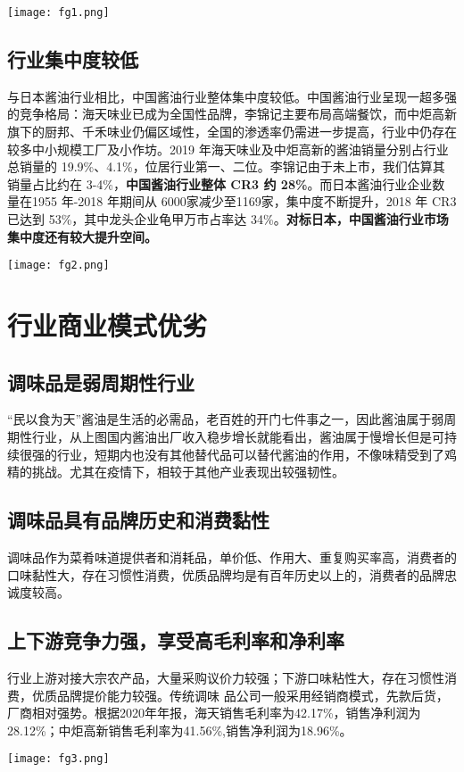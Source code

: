 \documentclass[UTF8,a4paper,zihao=-4,fontset = windows]{ctexart} %
\begin{document}
\texttt{[image: fg1.png]} 

\subsection{行业集中度较低}
与日本酱油行业相比，中国酱油行业整体集中度较低。中国酱油行业呈现一超多强的竞争格局：海天味业已成为全国性品牌，李锦记主要布局高端餐饮，而中炬高新旗下的厨邦、千禾味业仍偏区域性，全国的渗透率仍需进一步提高，行业中仍存在较多中小规模工厂及小作坊。2019 年海天味业及中炬高新的酱油销量分别占行业总销量的 19.9\%、4.1\%，位居行业第一、二位。李锦记由于未上市，我们估算其销量占比约在 3-4\%，\textbf{中国酱油行业整体 CR3 约 28\%}。而日本酱油行业企业数量在1955 年-2018 年期间从 6000家减少至1169家，集中度不断提升，2018 年 CR3 已达到 53\%，其中龙头企业龟甲万市占率达 34\%。\textbf{对标日本，中国酱油行业市场集中度还有较大提升空间。}

\texttt{[image: fg2.png]} 

\section{行业商业模式优劣}
\subsection{调味品是弱周期性行业}
“民以食为天”酱油是生活的必需品，老百姓的开门七件事之一，因此酱油属于弱周期性行业，从上图国内酱油出厂收入稳步增长就能看出，酱油属于慢增长但是可持续很强的行业，短期内也没有其他替代品可以替代酱油的作用，不像味精受到了鸡精的挑战。尤其在疫情下，相较于其他产业表现出较强韧性。
\subsection{调味品具有品牌历史和消费黏性}
调味品作为菜肴味道提供者和消耗品，单价低、作用大、重复购买率高，消费者的口味黏性大，存在习惯性消费，优质品牌均是有百年历史以上的，消费者的品牌忠诚度较高。
\subsection{上下游竞争力强，享受高毛利率和净利率}
行业上游对接大宗农产品，大量采购议价力较强；下游口味粘性大，存在习惯性消费，优质品牌提价能力较强。传统调味
品公司一般采用经销商模式，先款后货，厂商相对强势。根据2020年年报，海天销售毛利率为42.17\%，销售净利润为28.12\%；中炬高新销售毛利率为41.56\%,销售净利润为18.96\%。

\texttt{[image: fg3.png]} 
\end{document}
